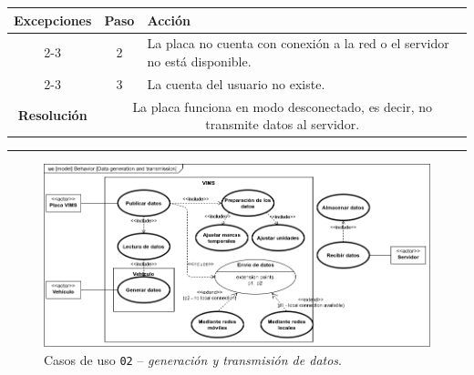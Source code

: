 \begin{table}[H]
\begin{tabularx}{\textwidth}{|c|c|X|}
    \hline
    \multirow{4}{*}{\textbf{Excepciones}}      & \textbf{Paso}                                                                                                          & \textbf{Acción}                                                                                                                    \\
    \cline{2-3}
                                               & 2                                                                                                                      & \multicolumn{1}{L|}{La placa no cuenta con conexión a la red o el servidor no está disponible.}                                    \\
    \cline{2-3}
                                               & 3                                                                                                                      & \multicolumn{1}{L|}{La cuenta del usuario no existe.}                                                                              \\
    \hline\hline
    \textbf{Resolución}                        & \multicolumn{2}{X|}{La placa funciona en modo desconectado, es decir, no transmite datos al servidor.}                                                                                                                                                      \\
    \hline
  \end{tabularx}
\end{table}

\noindent\rule{\linewidth}{.2pt}

\begin{figure}[H]
  \centering
  \includegraphics[width=\linewidth]{diagrams/UseCases-UC2 - data.png}
  \caption{Casos de uso \texttt{02} -- \textit{generación y transmisión de datos}.}
  \label{uc:data}
\end{figure}

